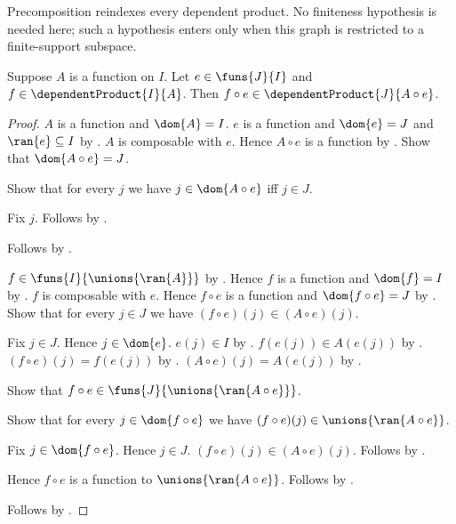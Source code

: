 Precomposition reindexes every dependent product.  No finiteness hypothesis is
needed here; such a hypothesis enters only when this graph is restricted to a
finite-support subspace.

\begin{proposition}\label{dependent_precomposition_type}
    Suppose $A$ is a function on $I$.
    Let $e\in\funs{J}{I}$ and $f\in\dependentProduct{I}{A}$.
    Then $f\circ e\in\dependentProduct{J}{A\circ e}$.
\end{proposition}
\begin{proof}
    $A$ is a function and $\dom{A}=I$.
    $e$ is a function and $\dom{e}=J$ and $\ran{e}\subseteq I$ by
        .
    $A$ is composable with $e$.
    Hence $A\circ e$ is a function by .
    Show that $\dom{A\circ e}=J$.
    \begin{subproof}
        Show that for every $j$ we have
            $j\in\dom{A\circ e}$ iff $j\in J$.
        \begin{subproof}
            Fix $j$.
            Follows by
                .
        \end{subproof}
        Follows by .
    \end{subproof}
    $f\in\funs{I}{\unions{\ran{A}}}$ by
        .
    Hence $f$ is a function and $\dom{f}=I$ by
        .
    $f$ is composable with $e$.
    Hence $f\circ e$ is a function and $\dom{f\circ e}=J$ by
        .
    Show that for every $j\in J$ we have
        $(f\circ e)(j)\in(A\circ e)(j)$.
    \begin{subproof}
        Fix $j\in J$.
        Hence $j\in\dom{e}$.
        $e(j)\in I$ by .
        $f(e(j))\in A(e(j))$ by
            .
        $(f\circ e)(j)=f(e(j))$ by
            .
        $(A\circ e)(j)=A(e(j))$ by
            .
    \end{subproof}
    Show that $f\circ e\in\funs{J}{\unions{\ran{A\circ e}}}$.
    \begin{subproof}
        Show that for every $j\in\dom{f\circ e}$ we have
            $(f\circ e)(j)\in\unions{\ran{A\circ e}}$.
        \begin{subproof}
            Fix $j\in\dom{f\circ e}$.
            Hence $j\in J$.
            $(f\circ e)(j)\in(A\circ e)(j)$.
            Follows by .
        \end{subproof}
        Hence $f\circ e$ is a function to
            $\unions{\ran{A\circ e}}$.
        Follows by .
    \end{subproof}
    Follows by .
\end{proof}


